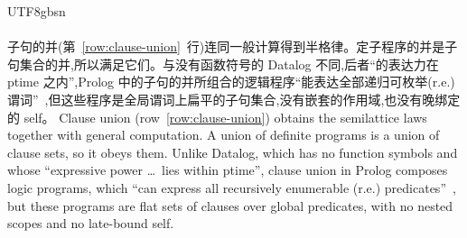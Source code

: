 \begin{CJK*}{UTF8}{gbsn}
\paragraph{}
\ifPaperChinese
子句的并(第~\ref{row:clause-union}~行)连同一般计算得到半格律。定子程序的并是子句集合的并,所以满足它们。与没有函数符号的 Datalog 不同,后者``的表达力在 ptime 之内'',Prolog 中的子句的并所组合的逻辑程序``能表达全部递归可枚举(r.e.)谓词''~\cite[第~299--300~页]{abiteboul1995-foundations-of-databases},但这些程序是全局谓词上扁平的子句集合,没有嵌套的作用域,也没有晚绑定的 self。
\else
Clause union (row~\ref{row:clause-union}) obtains the semilattice laws together with general computation.
A union of definite programs is a union of clause sets, so it obeys them.
Unlike Datalog, which has no function symbols and whose ``expressive power \ldots\ lies within ptime'',
clause union in Prolog composes logic programs, which ``can express all recursively enumerable (r.e.)
predicates''~\cite[pp.~299--300]{abiteboul1995-foundations-of-databases}, but these programs are flat sets
of clauses over global predicates, with no nested scopes and no late-bound self.
\fi


\end{CJK*}
